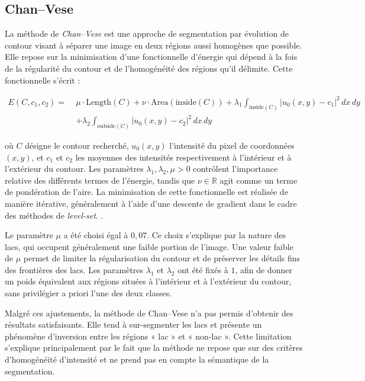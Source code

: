 \documentclass[11pt,a4paper]{article}
\begin{document}
\subsection{Chan–Vese}

La méthode de \textit{Chan--Vese} est une approche de segmentation par évolution de contour visant à séparer une image en deux régions aussi homogènes que possible. Elle repose sur la minimisation d’une fonctionnelle d’énergie qui dépend à la fois de la régularité du contour et de l’homogénéité des régions qu’il délimite. Cette fonctionnelle s’écrit :

$$
\begin{aligned}
E(C, c_1, c_2) =\;&
\mu \cdot \mathrm{Length}(C)
+ \nu \cdot \mathrm{Area}(\mathrm{inside}(C)) + \lambda_1 \int_{\mathrm{inside}(C)} 
\lvert u_0(x,y) - c_1 \rvert^2 \, dx\,dy \\
&+ \lambda_2 \int_{\mathrm{outside}(C)} 
\lvert u_0(x,y) - c_2 \rvert^2 \, dx\,dy
\end{aligned}
$$

où $C$ désigne le contour recherché, $u_0(x,y)$ l’intensité du pixel de coordonnées $(x,y)$, et $c_1$ et $c_2$ les moyennes des intensités respectivement à l’intérieur et à l’extérieur du contour. Les paramètres $\lambda_1, \lambda_2, \mu > 0$ contrôlent l’importance relative des différents termes de l’énergie, tandis que $\nu \in \mathbb{R}$ agit comme un terme de pondération de l’aire. La minimisation de cette fonctionnelle est réalisée de manière itérative, généralement à l’aide d’une descente de gradient dans le cadre des méthodes de \textit{level-set}. \cite{guiot2023segmentation}.

Le paramètre $\mu$ a été choisi égal à $0{,}07$. Ce choix s’explique par la nature des lacs, qui occupent généralement une faible portion de l’image. Une valeur faible de $\mu$ permet de limiter la régularisation du contour et de préserver les détails fins des frontières des lacs. Les paramètres $\lambda_1$ et $\lambda_2$ ont été fixés à $1$, afin de donner un poids équivalent aux régions situées à l’intérieur et à l’extérieur du contour, sans privilégier a priori l’une des deux classes.

Malgré ces ajustements, la méthode de Chan--Vese n’a pas permis d’obtenir des résultats satisfaisants. Elle tend à sur-segmenter les lacs et présente un phénomène d’inversion entre les régions « lac » et « non-lac ». Cette limitation s’explique principalement par le fait que la méthode ne repose que sur des critères d’homogénéité d’intensité et ne prend pas en compte la sémantique de la segmentation.
\end{document}
